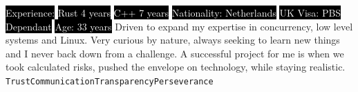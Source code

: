 \documentclass[9pt]{developercv} %
\begin{document}
\begin{minipage}[t]{0.2\textwidth} %
	\vspace{0.5em} %
    \setlength{\fboxsep}{0pt}%
    \setlength{\fboxrule}{1pt}%
\end{minipage}
\hspace{3.5em}
\begin{minipage}[t]{0.7\textwidth} %
	\vspace{0.5em} %


    \colorbox{black}{\textcolor{white}{Experience:}}
    \colorbox{black}{\textcolor{white}{Rust 4 years}}
    \colorbox{black}{\textcolor{white}{C++ 7 years}}
    \newline{}
    \colorbox{black}{\textcolor{white}{Nationality: Netherlands}}
    \colorbox{black}{\textcolor{white}{UK Visa: PBS Dependant}}
    \newline{}
    \colorbox{black}{\textcolor{white}{Age: 33 years}}
    \newline{}
    \newline{}
     Driven to expand my expertise in concurrency, low level systems and Linux. Very curious by nature, always seeking to learn new things and I never back down from a challenge.\newline{}
    A successful project for me is when we took calculated risks, pushed the
    envelope on technology, while staying realistic.
    \newline{}
    \texttt{Trust}\slashsep\texttt{Communication}\slashsep\texttt{Transparency}\slashsep\texttt{Perseverance}
\end{minipage}
\end{document}
